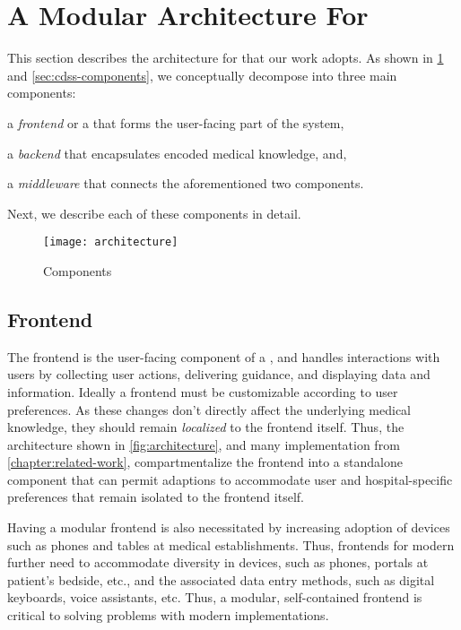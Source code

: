 \section{A Modular Architecture For \CDSSs{}}\label{sec:modular-cdss-architecture}
This section describes the architecture for \CDSSs{}
that our work adopts. As shown in \figurename{} \ref{fig:architecture}
and \autoref{sec:cdss-components}, we conceptually
decompose \CDSSs{} into three main components:
\begin{enumerate*}[label=(\roman*)]
    \item a \emph{frontend} or a \UI{} that forms the user-facing part of the system,
    \item a \emph{backend} that encapsulates encoded medical knowledge, and,
    \item a \emph{middleware} that connects the aforementioned two components.
\end{enumerate*}
Next, we describe each of these components in detail.

\begin{figure}[t]
\centering
\texttt{[image: architecture]}
\caption{\CDSSs{} Components}\label{fig:architecture}
\end{figure}


\subsection{Frontend}\label{sec:frontend}

The frontend is the user-facing component of a \CDSS{}, and
handles interactions with users by collecting user actions,
delivering guidance, and displaying data and information.
Ideally a \CDSS{} frontend must be customizable according to
user preferences. As these changes don't directly
affect the underlying medical knowledge, they should remain
\emph{localized} to the frontend itself.
Thus, the architecture shown in \autoref{fig:architecture},
and many implementation from \autoref{chapter:related-work},
compartmentalize the frontend into a standalone component that
can permit adaptions to accommodate user and hospital-specific
preferences that remain isolated to the frontend itself.

Having a modular frontend is also necessitated by increasing
adoption of devices such as phones and tables at medical establishments.
Thus, frontends for modern \CDSSs{} further need to accommodate
diversity in devices, such as phones, portals at patient's bedside, etc.,
and the associated data entry methods, such as digital keyboards, voice
assistants, etc. Thus, a modular, self-contained frontend is
critical to solving problems with modern \CDSS{} implementations.

